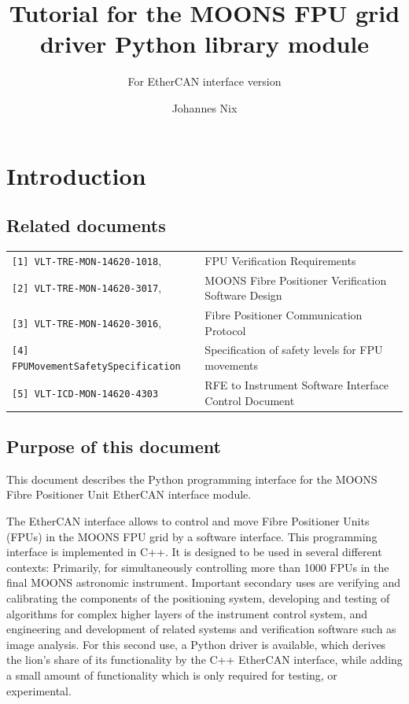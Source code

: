 \documentclass[11pt,a4paper]{scrartcl}
\begin{document}
\title{Tutorial for the MOONS FPU grid driver Python library
  module} \subtitle{For EtherCAN interface version }

\author{Johannes Nix}

\maketitle

\tableofcontents


\section{Introduction}
\subsection{Related documents}

\begin{tabular}{|ll|}
  \hline
\verb+[1] VLT-TRE-MON-14620-1018+, &  FPU Verification Requirements \\
\verb+[2] VLT-TRE-MON-14620-3017+, & MOONS Fibre Positioner Verification Software Design \\
\verb+[3] VLT-TRE-MON-14620-3016+, & Fibre Positioner Communication Protocol\\
\verb+[4] FPUMovementSafetySpecification+ & Specification of safety levels for FPU movements\\
\verb+[5] VLT-ICD-MON-14620-4303+ & RFE to Instrument Software Interface Control Document \\
\hline
\end{tabular}


\subsection{Purpose of this document}
This document describes the Python programming interface for the MOONS
Fibre Positioner Unit EtherCAN interface module.

The EtherCAN interface allows to control and move Fibre Positioner
Units (FPUs) in the MOONS FPU grid by a software interface. This
programming interface is implemented in C++. It is designed to be used
in several different contexts: Primarily, for simultaneously
controlling more than 1000 FPUs in the final MOONS astronomic
instrument. Important secondary uses are verifying and calibrating the
components of the positioning system, developing and testing of
algorithms for complex higher layers of the instrument control system,
and engineering and development of related systems and verification
software such as image analysis. For this second use, a Python driver
is available, which derives the lion's share of its functionality by
the C++ EtherCAN interface, while adding a small amount of
functionality which is only required for testing, or experimental.
\end{document}
